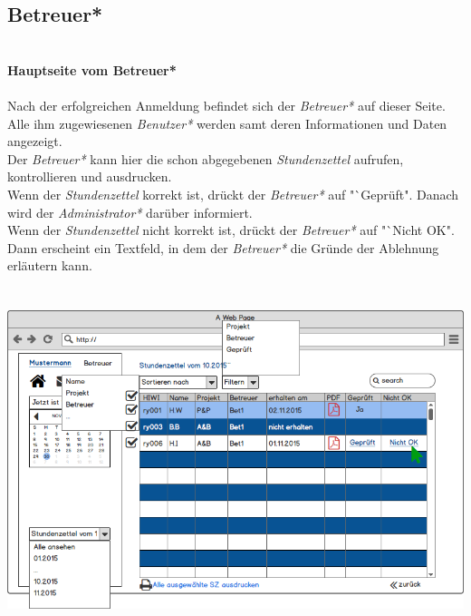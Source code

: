 \subsection{Betreuer*}
\textbf{\\Hauptseite vom Betreuer*}\\
\\
Nach der erfolgreichen Anmeldung befindet sich der \emph{Betreuer*} auf dieser Seite.\\
Alle ihm zugewiesenen \emph{Benutzer*} werden samt deren Informationen und Daten angezeigt.\\
Der \emph{Betreuer*} kann hier die schon abgegebenen \emph{Stundenzettel} aufrufen, kontrollieren und ausdrucken.\\
Wenn der \emph{Stundenzettel} korrekt ist, drückt der \emph{Betreuer*} auf "`Geprüft". Danach wird der \emph{Administrator*} darüber informiert.\\
Wenn der \emph{Stundenzettel} nicht korrekt ist, drückt der \emph{Betreuer*} auf "`Nicht OK". Dann erscheint ein Textfeld, in dem der \emph{Betreuer*} die Gründe der Ablehnung erläutern kann.\\
\\
\\
\includegraphics[width=\linewidth]{UI/Betreuer/Hauptseite.png}

